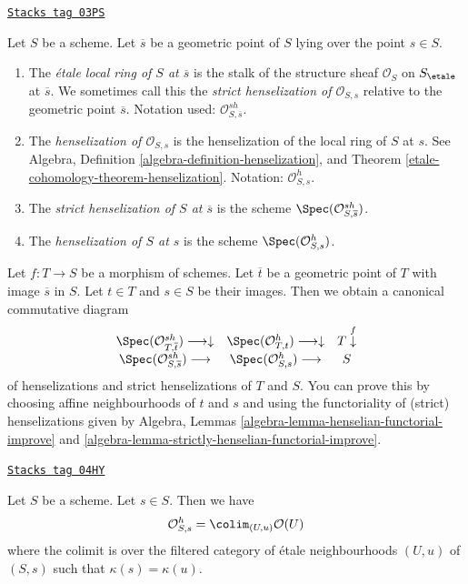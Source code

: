 \begin{definition}
\label{etale-cohomology-definition-etale-local-rings}
\href{https://stacks.math.columbia.edu/tag/03PS}{\texttt{Stacks tag 03PS}}

Let $S$ be a scheme. Let $\overline{s}$ be a geometric point of $S$
lying over the point $s \in S$.
\begin{enumerate}
\item The {\it \'etale local ring of $S$ at $\overline{s}$}
is the stalk of the structure sheaf $\mathcal{O}_S$ on $S_\etale$
at $\overline{s}$. We sometimes call this the
{\it strict henselization of $\mathcal{O}_{S, s}$} relative
to the geometric point $\overline{s}$.
Notation used: $\mathcal{O}_{S, \overline{s}}^{sh}$.
\item The {\it henselization of $\mathcal{O}_{S, s}$} is the
henselization of the local ring of $S$ at $s$. See
Algebra, Definition \ref{algebra-definition-henselization},
and
Theorem \ref{etale-cohomology-theorem-henselization}.
Notation: $\mathcal{O}_{S, s}^h$.
\item The {\it strict henselization of $S$ at $\overline{s}$}
is the scheme $\Spec(\mathcal{O}_{S, \overline{s}}^{sh})$.
\item The {\it henselization of $S$ at $s$} is the scheme
$\Spec(\mathcal{O}_{S, s}^h)$.
\end{enumerate}
\end{definition}

Let $f : T \to S$ be a morphism of schemes. Let $\overline{t}$
be a geometric point of $T$ with image $\overline{s}$ in $S$.
Let $t \in T$ and $s \in S$ be their images.
Then we obtain a canonical commutative diagram
$$
\begin{array}{ccc}\Spec(\mathcal{O}^{sh}_{T, \overline{t}}) \longrightarrow\downarrow & \Spec(\mathcal{O}^h_{T, t}) \longrightarrow\downarrow & T \overset{f}{\downarrow} \\ \Spec(\mathcal{O}^{sh}_{S, \overline{s}}) \longrightarrow & \Spec(\mathcal{O}^h_{S, s}) \longrightarrow & S\end{array}
$$
of henselizations and strict henselizations of $T$ and $S$. You can
prove this by choosing affine neighbourhoods of $t$ and $s$ and using
the functoriality of (strict) henselizations given by
Algebra, Lemmas \ref{algebra-lemma-henselian-functorial-improve} and
\ref{algebra-lemma-strictly-henselian-functorial-improve}.

\begin{lemma}
\label{etale-cohomology-lemma-describe-henselization}
\href{https://stacks.math.columbia.edu/tag/04HY}{\texttt{Stacks tag 04HY}}

Let $S$ be a scheme. Let $s \in S$. Then we have
$$
\mathcal{O}_{S, s}^h =
\colim_{(U, u)} \mathcal{O}(U)
$$
where the colimit is over the filtered category of
\'etale neighbourhoods $(U, u)$ of $(S, s)$ such that
$\kappa(s) = \kappa(u)$.
\end{lemma}

